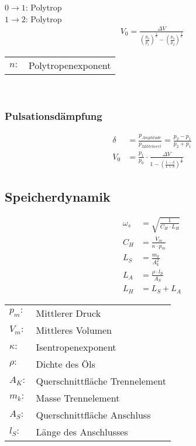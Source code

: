 $0 \rightarrow 1$: Polytrop \\
 $1 \rightarrow 2$: Polytrop
\begin{align*}
V_0 = \frac{\Delta V}{\left( \frac{p_0}{p_1} \right)^{\frac{1}{n}} - \left( \frac{p_0}{p_2} \right)^{\frac{1}{n}}}
\end{align*}

\begin{tabular}{ll}
$n:$ & Polytropenexponent
\end{tabular} \\



\subsubsection{Pulsationsdämpfung}
\begin{align*}
\delta &= \frac{p_{Amplitude}}{p_{Mittelwert}} = \frac{p_2 - p_1}{p_2 + p_1} \\
V_0 &= \frac{p_1}{p_0} \cdot \frac{\Delta V}{1 - \left( \frac{1-\delta}{1+\delta}\right)^{\frac{1}{n}}}
\end{align*}


\subsection{Speicherdynamik}
\begin{align*}
\omega_s &= \sqrt{\frac{1}{C_H \cdot L_H}} \tag{Eigenfrequenz} \\
C_H &= \frac{V_m}{\kappa \cdot p_m} \tag{Speicherkapazität} \\
L_S &= \frac{m_k}{A_k^2} \tag{Speicherinduktivität} \\
L_A &= \frac{\rho \cdot l_S}{A_S} \tag{Anschlussinduktivität} \\
L_H &= L_S + L_A
\end{align*}

\begin{tabular}{ll}
$p_m:$ & Mittlerer Druck \\
$V_m:$ & Mittleres Volumen \\
$\kappa:$ & Isentropenexponent \\
$\rho:$ & Dichte des Öls \\
$A_K:$ & Querschnittfläche Trennelement \\
$m_k:$ & Masse Trennelement \\
$A_S:$ & Querschnittfläche Anschluss \\
$l_S:$ & Länge des Anschlusses
\end{tabular}







\vfill
\columnbreak
